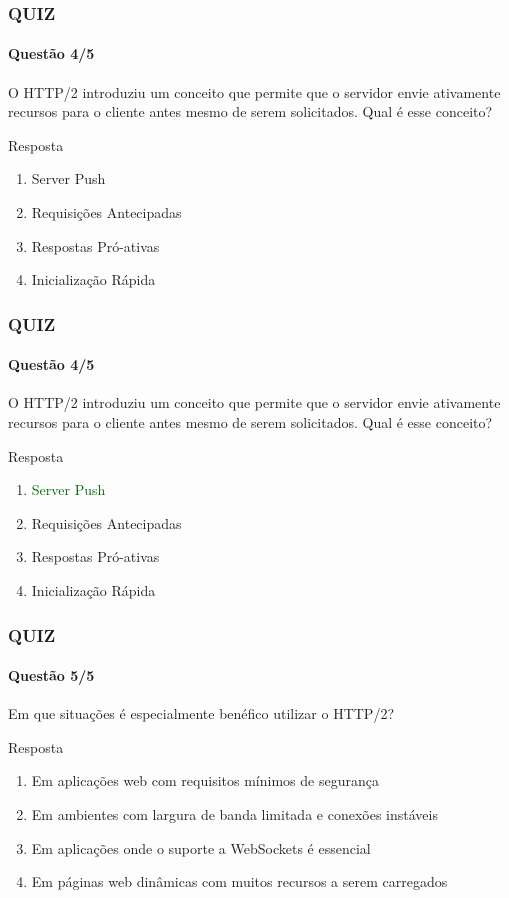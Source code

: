 \documentclass[
	9pt, %
	t, %
]{beamer}
\begin{document}
\begin{frame}
	\frametitle{QUIZ}
	\framesubtitle{Questão 4/5}

	{\Large O HTTP/2 introduziu um conceito que permite que o servidor envie ativamente recursos para o cliente antes mesmo de serem solicitados. Qual é esse conceito?	}

	\begin{exampleblock}{Resposta}
		\begin{enumerate}[a]
			\item Server Push
			\item Requisições Antecipadas
			\item Respostas Pró-ativas
			\item Inicialização Rápida
		\end{enumerate}
	\end{exampleblock}

\end{frame}

\begin{frame}
	\frametitle{QUIZ}
	\framesubtitle{Questão 4/5}

	{\Large O HTTP/2 introduziu um conceito que permite que o servidor envie ativamente recursos para o cliente antes mesmo de serem solicitados. Qual é esse conceito?	}

	\begin{exampleblock}{Resposta}
		\begin{enumerate}[a]
			\item \textcolor{darkgreen}{Server Push}
			\item Requisições Antecipadas
			\item Respostas Pró-ativas
			\item Inicialização Rápida
		\end{enumerate}
	\end{exampleblock}

\end{frame}

\begin{frame}
	\frametitle{QUIZ}
	\framesubtitle{Questão 5/5}

	{\Large Em que situações é especialmente benéfico utilizar o HTTP/2? }

	\begin{exampleblock}{Resposta}
		\begin{enumerate}[a]
			\item Em aplicações web com requisitos mínimos de segurança
			\item Em ambientes com largura de banda limitada e conexões instáveis
			\item Em aplicações onde o suporte a WebSockets é essencial
			\item Em páginas web dinâmicas com muitos recursos a serem carregados
		\end{enumerate}
	\end{exampleblock}

\end{frame}
\end{document}
